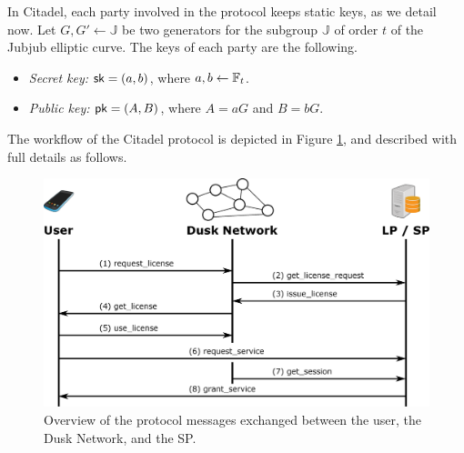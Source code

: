
In Citadel, each party involved in the protocol keeps static keys, as we detail now. Let $G, G'\gets\mathbb{J}$ be two generators for the subgroup $\mathbb{J}$ of order $t$ of the Jubjub elliptic curve. The keys of each party are the following.

\begin{itemize}%
	\item \textit{Secret key:} $\mathsf{sk} = (a,b)$, where $a,b\gets \mathbb{F}_t$.
	\item \textit{Public key:} $\mathsf{pk} = (A,B)$, where $A = a G$ and $B = b G$.
\end{itemize}

The workflow of the Citadel protocol is depicted in Figure \ref{fig:protocol}, and described with full details as follows.

\begin{figure}[h]
	\centering
		\includegraphics[width=390pt,draft=false]{images/protocol.eps}
	\caption{Overview of the protocol messages exchanged between the user, the Dusk Network, and the SP.}
	\label{fig:protocol}
\end{figure}


